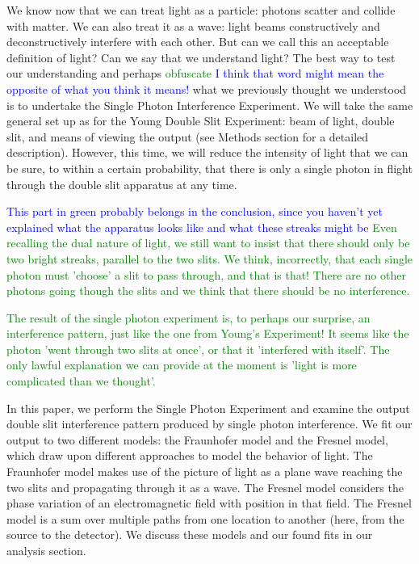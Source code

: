 \documentclass[prb,preprint]{revtex4-1}
\begin{document}
We know now that we can treat light as a particle: photons scatter and collide with matter.  We can also treat it as a wave: light beams constructively and deconstructively interfere with each other.  But can we call this an acceptable definition of light?  Can we say that we understand light?  The best way to test our understanding and perhaps \textcolor{green}{obfuscate} \textcolor{blue}{I think that word might mean the opposite of what you think it means!}  what we previously thought we understood is to undertake the Single Photon Interference Experiment.  We will take the same general set up as for the Young Double Slit Experiment:  beam of light, double slit, and means of viewing the output (see Methods section for a detailed description).  However, this time, we will reduce the intensity of light that we can be sure, to within a certain probability, that there is only a single photon in flight through the double slit apparatus at any time. \cite{teachspin}

\textcolor{blue}{This part in green probably belongs in the conclusion, since you haven't yet explained what the apparatus looks like and what these streaks might be}\textcolor{green}{ Even recalling the dual nature of light, we still want to insist that there should only be two bright streaks, parallel to the two slits.  We think, incorrectly, that each single photon must 'choose' a slit to pass through, and that is that!  There are no other photons going though the slits and we think that there should be no interference. } 

\textcolor{green}{The result of the single photon experiment is, to perhaps our surprise, an interference pattern, just like the one from Young's Experiment!  It seems like the photon 'went through two slits at once', or that it 'interfered with itself'.  The only lawful explanation we can provide at the moment is 'light is more complicated than we thought'. }

In this paper, we perform the Single Photon Experiment and examine the output double slit interference pattern produced by single photon interference.  We fit our output to two different models:  the Fraunhofer model and the Fresnel model, which draw upon different approaches to model the behavior of light.  The Fraunhofer model makes use of the picture of light as a plane wave reaching the two slits and propagating through it as a wave.  The Fresnel model considers the phase variation of an electromagnetic field with position in that field.  The Fresnel model is a sum over multiple paths from one location to another (here, from the source to the detector).  We discuss these models and our found fits in our analysis section.
\end{document}
